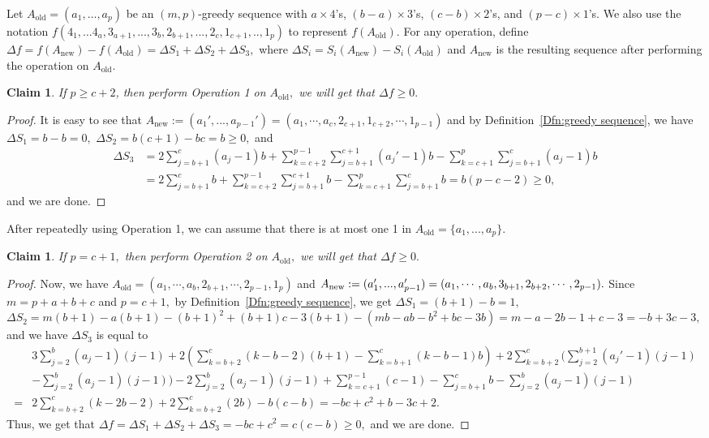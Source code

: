 \documentclass[11pt,a4paper]{article}
\newtheorem{clm}[dfn]{Claim}
\begin{document}
Let $A_{\text{old}} = (a_1,\dots,a_p)$ be an $(m,p)$-greedy sequence with $a \times 4$'s, $(b-a) \times 3$'s, $(c-b) \times 2$'s, and $(p-c) \times 1$'s. 
We also use the notation $f(4_1,...4_a,3_{a+1},...,3_b,2_{b+1},...,2_c,1_{c+1},..,1_p)$ to represent $f(A_{\text{old}}).$
For any operation, define $\Delta f =f(A_{\text{new}}) - f(A_{\text{old}}) = \Delta S_1 + \Delta S_2 + \Delta S_3,$
where $\Delta S_i = S_i(A_{\text{new}}) - S_i(A_{\text{old}})$ and $A_{\text{new}}$ is the resulting sequence after performing the operation on $A_{\text{old}}.$
\begin{clm}\label{Clm:adjust 1}
	If $p\geq c+2$, then perform Operation 1 on $A_{\text{old}},$ 
    we will get that $\Delta f\ge0.$
\end{clm}
\begin{proof}
It is easy to see that $A_{\text{new}}:=(a_1',...,a_{p-1}')=(a_1,\cdots, a_c,2_{c+1},1_{c+2},\cdots,1_{p-1})$ and 
by Definition~\ref{Dfn:greedy sequence}, we have 
$\Delta S_1 = b-b = 0,$ 
$\Delta S_2 = b(c+1)-bc = b\ge 0,$
and
\begin{align*}
\Delta S_3
&=
2\sum_{j=b+1}^{c}(a_j-1)b + \sum_{k=c+2}^{p-1}\sum_{j=b+1}^{c+1}(a_j'-1)b  - \sum_{k=c+1}^{p}\sum_{j=b+1}^{c}(a_j-1)b\\
&=
2\sum_{j=b+1}^{c}b + \sum_{k=c+2}^{p-1}\sum_{j=b+1}^{c+1}b - \sum_{k=c+1}^{p} \sum_{j=b+1}^{c}b
=b(p-c-2) \geq 0,
\end{align*}
and we are done.
\end{proof}

After repeatedly using Operation 1, we can assume that there is at most one 1 in $A_{\text{old}}=\{a_1,...,a_p\}$.

\begin{clm}\label{Clm:adjust 2}
    If $p=c+1,$ 
    then perform Operation 2 on $A_{\text{old}},$ 
    we will get that $\Delta f\ge0.$
\end{clm}
\begin{proof}
Now, we have $A_{\text{old}}=(a_1,\cdots, a_b,2_{b+1},\cdots,2_{p-1},1_{p})$ and 
$A_{\text{new}}:=(a_1',...,a_{p-1}')=(a_1,\cdots, a_b,\\ 3_{b+1},2_{b+2},\cdots,2_{p-1}).$
Since $m=p+a+b+c$ and $p=c+1,$ by Definition~\ref{Dfn:greedy sequence}, 
we get
$\Delta S_1 =(b+1)-b=1,$ 
$\Delta S_2=m(b+1)-a(b+1)-(b+1)^2+(b+1)c-3(b+1)-(mb-ab-b^2+bc-3b)
=m-a-2b-1+c-3=-b+3c-3,$
and we have $\Delta S_3$ is equal to
\begin{align*}
&3\sum_{j=2}^{b}(a_j-1)(j-1)
+2\left(\sum_{k=b+2}^{c}(k-b-2)(b+1)-\sum_{k=b+1}^{c}(k-b-1)b\right) + 2\sum_{k=b+2}^{c}
\Bigg(\sum_{j=2}^{b+1}(a_j'-1)(j-1)\\
&-\sum_{j=2}^{b}(a_j-1)(j-1)\Bigg) - 2\sum_{j=2}^{b}(a_j-1)(j-1) +\sum_{k=c+1}^{p-1}(c-1)-\sum_{j=b+1}^{c}b-\sum_{j=2}^{b}(a_j-1)(j-1) \\
=&2\sum_{k=b+2}^{c}(k-2b-2)+2\sum_{k=b+2}^{c}(2b)-b(c-b)
=-bc+c^2+b-3c+2.
\end{align*}
Thus, we get that
$\Delta f= \Delta S_1+\Delta S_2+\Delta S_3= -bc+c^2 =c(c-b) \geq 0,$ 
and we are done.
\end{proof}
\end{document}
